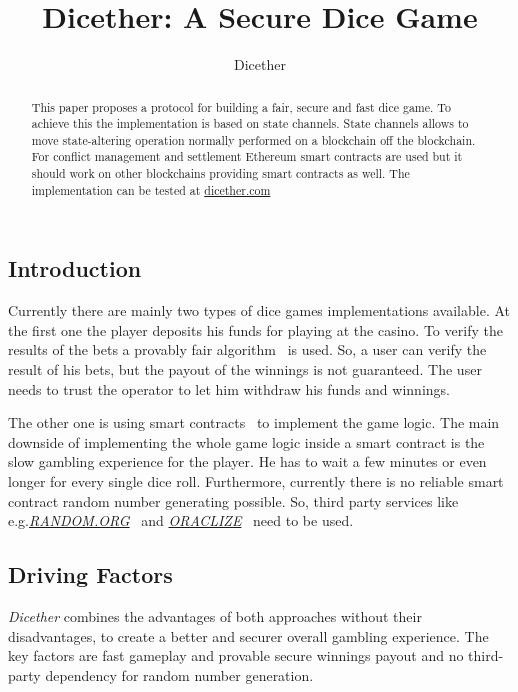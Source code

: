 \documentclass[oneside]{amsart}
\title{Dicether: A Secure Dice Game \DicetherPaperVersionNumber}
\author{Dicether}
\makeatletter
\newcommand*\eg{e.g.\@\xspace}
\makeatother
\begin{document}
\begin{abstract}
This paper proposes a protocol for building a fair, secure and fast dice game.
To achieve this the implementation is based on state channels.
State channels allows to move state-altering operation normally performed on a blockchain off the blockchain.
For conflict management and settlement Ethereum smart contracts are used but it should work on other blockchains providing
smart contracts as well.
The implementation can be tested at \url{dicether.com}
\end{abstract}

\maketitle

\setlength{\columnsep}{20pt}
\begin{multicols}{2}

\section{Introduction}\label{sec:introduction}
Currently there are mainly two types of dice games implementations available.
At the first one the player deposits his funds for playing at the casino.
To verify the results of the bets a provably fair algorithm~\cite{provableFair} is used.
So, a user can verify the result of his bets, but the payout of the winnings is not guaranteed.
The user needs to trust the operator to let him withdraw his funds and winnings.

The other one is using  smart contracts~\cite{ethereum} to implement the game logic.
The main downside of implementing the whole game logic inside a smart contract is the slow gambling experience for the player.
He has to wait a few minutes or even longer for every single dice roll.
Furthermore, currently there is no reliable smart contract random number generating possible.
So, third party services like \eg \href{https://random.org}{\emph{RANDOM.ORG}}~\cite{randomOrg}
and \href{https://oraclize.it}{\emph{ORACLIZE}}~\cite{oraclize} need to be used.

\subsection{Driving Factors}\label{subsec:driving_factors}
\emph{Dicether} combines the advantages of both approaches without
their disadvantages, to create a better and securer overall gambling experience.
The key factors are fast gameplay and provable secure winnings payout and no third-party dependency for
random number generation.


\end{multicols}
\end{document}
